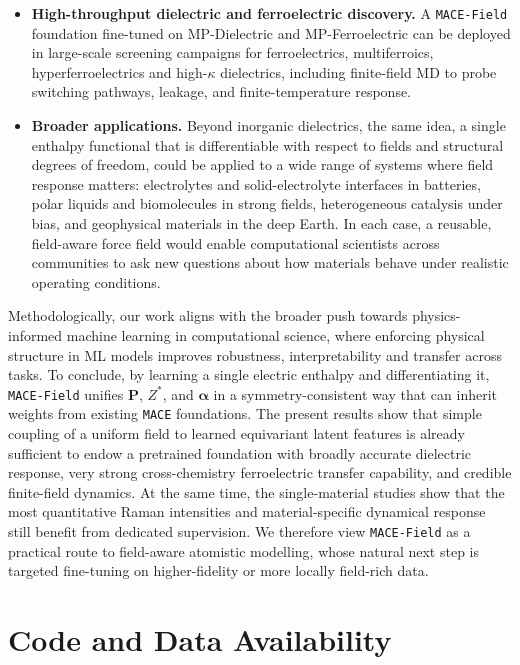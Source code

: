 \documentclass[aps,physrev,graphicx,amsmath,amssymb,
               reprint,superscriptaddress]{revtex4-2}
\begin{document}
\begin{itemize}
  \item \textbf{High-throughput dielectric and ferroelectric discovery.}
  A \texttt{MACE-Field} foundation fine-tuned on MP-Dielectric and MP-Ferroelectric can be deployed in
  large-scale screening campaigns for ferroelectrics, multiferroics, hyperferroelectrics and high-$\kappa$
  dielectrics, including finite-field MD to probe switching pathways, leakage, and finite-temperature
  response.

  \item \textbf{Broader applications.}
  Beyond inorganic dielectrics, the same idea, a single enthalpy functional that is differentiable with respect to fields and structural degrees of freedom, could be applied to a wide range of systems where field response matters: electrolytes and solid-electrolyte interfaces in batteries, polar liquids and biomolecules in strong fields, heterogeneous catalysis under bias, and geophysical materials in the deep Earth. In each case, a reusable, field-aware force field would enable computational scientists across communities to ask new questions about how materials behave under realistic operating conditions.
\end{itemize}

Methodologically, our work aligns with the broader push towards physics-informed machine learning in computational science, where enforcing physical structure in ML models improves robustness, interpretability and transfer across tasks. To conclude, by learning a single electric enthalpy and differentiating it, \texttt{MACE-Field} unifies $\mathbf P$, $Z^*$, and $\boldsymbol\alpha$ in a symmetry-consistent way that can inherit weights from existing \texttt{MACE} foundations. The present results show that simple coupling of a uniform field to learned equivariant latent features is already sufficient to endow a pretrained foundation with broadly accurate dielectric response, very strong cross-chemistry ferroelectric transfer capability, and credible finite-field dynamics. At the same time, the single-material studies show that the most quantitative Raman intensities and material-specific dynamical response still benefit from dedicated supervision. We therefore view \texttt{MACE-Field} as a practical route to field-aware atomistic modelling, whose natural next step is targeted fine-tuning on higher-fidelity or more locally field-rich data.

\section*{Code and Data Availability}
\end{document}
